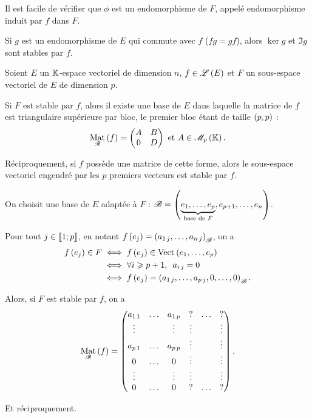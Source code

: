 Il est facile de vérifier que \(\phi\) est un endomorphisme de \(F\), appelé endomorphisme induit par \(f\) dans \(F\).

\begin{ex}
Si \(g\) est un endomorphisme de \(E\) qui commute avec \(f\) (\ie \(fg=gf\)), alors \(\ker g\) et \(\Im g\) sont stables par \(f\).
\end{ex}

\begin{prop}
Soient \(E\) un \(\mathbb{K}\)-espace vectoriel de dimension \(n\), \(f\in\mathscr{L}\left(E\right)\) et \(F\) un sous-espace vectoriel de \(E\) de dimension \(p\).

Si \(F\) est stable par \(f\), alors il existe une base de \(E\) dans laquelle la matrice de \(f\) est triangulaire supérieure par bloc, le premier bloc étant de taille \(\left(p,p\right)\) : \[\Mat{f}=\begin{pmatrix}
A & B \\
0 & D
\end{pmatrix}\text{ et }A\in\M{p}.\]

Réciproquement, si \(f\) possède une matrice de cette forme, alors le sous-espace vectoriel engendré par les \(p\) premiers vecteurs est stable par \(f\).
\end{prop}

\begin{dem}
On choisit une base de \(E\) adaptée à \(F\) : \(\mathscr{B}=\left(\underbrace{e_1,\dots,e_p}_{\text{base de }F},e_{p+1},\dots,e_n\right)\).

Pour tout \(j\in\left\llbracket1;p\right\rrbracket\), en notant \(f\left(e_j\right)=\left(a_{1\,j},\dots,a_{n\,j}\right)_{\mathscr{B}}\), on a \[\begin{aligned}
f\paren{e_j}\in F&\ssi f\paren{e_j}\in\Vect{e_1,\dots,e_p} \\
&\ssi\quantifs{\forall i\geq p+1}a_{i\,j}=0 \\
&\ssi f\paren{e_j}=\paren{a_{1\,j},\dots,a_{p\,j},0,\dots,0}_{\fami{B}}.
\end{aligned}\]

Alors, si \(F\) est stable par \(f\), on a \[\Mat{f}=\begin{pmatrix}
a_{1\,1} & \dots & a_{1\,p} & ? & \dots & ? \\
\vdots &  & \vdots & \vdots &  & \vdots \\
a_{p\,1} & \dots & a_{p\,p} & \vdots &  & \vdots \\
0 & \dots & 0 & \vdots &  & \vdots \\
\vdots &  & \vdots & \vdots &  & \vdots \\
0 & \dots & 0 & ? & \dots & ?
\end{pmatrix}.\]

Et réciproquement.
\end{dem}

